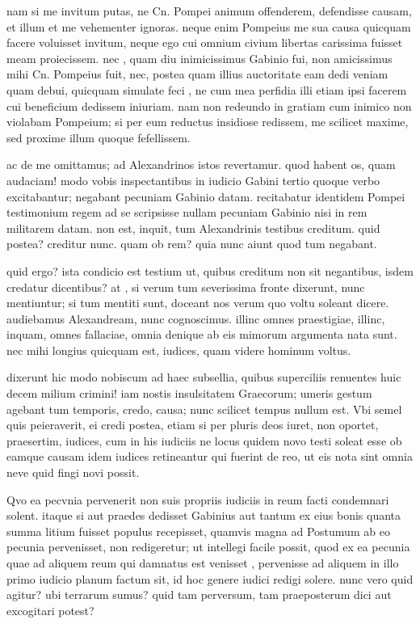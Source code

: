  nam si me invitum putas, ne Cn. Pompei animum offenderem, defendisse causam, et illum et me vehementer ignoras. neque enim Pompeius me sua causa quicquam facere voluisset invitum, neque ego cui omnium civium libertas carissima fuisset meam proiecissem. nec , quam diu inimicissimus Gabinio fui, non amicissimus mihi Cn. Pompeius fuit, nec, postea quam illius auctoritate eam dedi veniam quam debui, quicquam simulate feci , ne cum mea perfidia illi etiam ipsi facerem cui beneficium dedissem iniuriam. nam non redeundo in gratiam cum inimico non violabam Pompeium; si per eum reductus insidiose redissem, me scilicet maxime, sed proxime illum quoque fefellissem.

 ac de me omittamus; ad Alexandrinos istos revertamur. quod habent os, quam audaciam! modo vobis inspectantibus in iudicio Gabini tertio quoque verbo excitabantur; negabant pecuniam Gabinio datam. recitabatur identidem Pompei testimonium regem ad se scripsisse nullam pecuniam Gabinio nisi in rem militarem datam. non est, inquit, tum Alexandrinis testibus creditum. quid postea? creditur nunc. quam ob rem? quia nunc aiunt quod tum negabant.

 quid ergo? ista condicio est testium ut, quibus creditum non sit negantibus, isdem credatur dicentibus? at , si verum tum severissima fronte dixerunt, nunc mentiuntur; si tum mentiti sunt, doceant nos verum quo voltu soleant dicere. audiebamus Alexandream, nunc cognoscimus. illinc omnes praestigiae, illinc, inquam, omnes fallaciae, omnia denique ab eis mimorum argumenta nata sunt. nec mihi longius quicquam est, iudices, quam videre hominum voltus.

 dixerunt hic modo nobiscum ad haec subsellia, quibus superciliis renuentes huic decem milium crimini! iam nostis insulsitatem Graecorum; umeris gestum agebant tum temporis, credo, causa; nunc scilicet tempus nullum est. Vbi semel quis peieraverit, ei credi postea, etiam si per pluris deos iuret, non oportet, praesertim, iudices, cum in his iudiciis ne locus quidem novo testi soleat esse ob eamque causam idem iudices retineantur qui fuerint de reo, ut eis nota sint omnia neve quid fingi novi possit.

 Qvo ea pecvnia pervenerit non suis propriis iudiciis in reum facti condemnari solent. itaque si aut praedes dedisset Gabinius aut tantum ex eius bonis quanta summa litium fuisset populus recepisset, quamvis magna ad Postumum ab eo pecunia pervenisset, non redigeretur; ut intellegi facile possit, quod ex ea pecunia quae ad aliquem reum qui damnatus est venisset , pervenisse ad aliquem in illo primo iudicio planum factum sit, id hoc genere iudici redigi solere. nunc vero quid agitur? ubi terrarum sumus? quid tam perversum, tam praeposterum dici aut excogitari potest?

